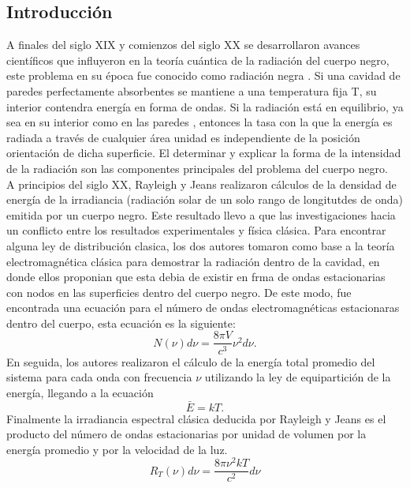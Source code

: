 \documentclass[12pt,letterpaper]{article}
\begin{document}
\begin{multicols}{2}
\section*{Introducción}
A finales del siglo XIX y comienzos del siglo XX se desarrollaron avances científicos que influyeron en la teoría cuántica de la radiación del cuerpo negro, este problema en su época fue conocido como radiación negra \cite{Planck1901}. Si una cavidad de paredes perfectamente absorbentes se mantiene a una temperatura fija T, su interior contendra energía en forma de ondas. Si la radiación está en equilibrio, ya sea en su interior como en las paredes
, entonces la tasa con la que la energía es radiada a través de cualquier área unidad es independiente de la posición  orientación de dicha superficie. El determinar y explicar la forma de la intensidad de la radiación son las componentes principales del problema del cuerpo negro. \\
A principios del siglo XX, Rayleigh \cite{LordRayleigh1900} y Jeans \cite{JHJeans1902} realizaron cálculos de la densidad de energía de la irradiancia (radiación solar de un solo rango de longitutdes de onda) emitida por un cuerpo negro. Este resultado llevo a que las investigaciones hacia un conflicto entre los resultados experimentales y física clásica. Para encontrar alguna ley de distribución clasica, los dos autores tomaron como base a la teoría electromagnética clásica para demostrar la radiación dentro de la cavidad, en donde ellos proponian que esta debia de existir en frma de ondas estacionarias con nodos en las superficies dentro del cuerpo negro. De este modo, fue encontrada 
una ecuación para el número de ondas electromagnéticas estacionaras dentro del cuerpo, esta ecuación es la siguiente: 
\begin{equation}
N(\nu)d\nu = \frac{8\pi V}{c^3} \nu^2 d\nu.
\label{N(nu)dnu}
\end{equation}
En seguida, los autores realizaron el cálculo de la energía total promedio del sistema para cada onda con frecuencia $\nu$ utilizando la ley de equipartición de la energía, llegando a la ecuación
\begin{equation}
\bar{E}=kT.
\end{equation}
Finalmente la irradiancia espectral clásica deducida por Rayleigh y Jeans es el producto del número de ondas estacionarias por unidad de volumen por la energía promedio y por la velocidad de la luz.
\begin{equation}
R_T(\nu)d\nu = \frac{8\pi \nu^2 kT}{c^2} d\nu 

\end{equation}
\end{multicols}
\end{document}
